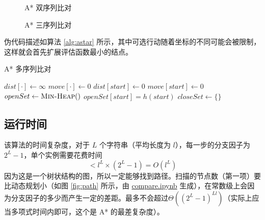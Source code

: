     \begin{figure}[h]
        \centering
        \begin{minipage}{0.48\textwidth}
            \centering
            
            \caption{A* 双序列比对}\label{fig:pairwiseastar}
        \end{minipage}
        \begin{minipage}{0.48\textwidth}
            \centering
            
            \caption{A* 三序列比对}\label{fig:multipleastar}
        \end{minipage}
    \end{figure}

    伪代码描述如算法 \ref{alg:astar} 所示\cite{astarwiki}，其中可选行动随着坐标的不同可能会被限制，这样就会首先扩展评估函数最小的结点。

    \begin{algorithm}[h]
        \caption{A* 多序列比对}\label{alg:astar}
        \BlankLine
        $dist[\cdot]\leftarrow\infty$\;
        $move[\cdot]\leftarrow 0$\;
        $dist[start]\leftarrow 0$\;
        $move[start]\leftarrow 0$\;
        $openSet\leftarrow\textsc{Min-Heap}()$\;
        $openSet[start]=h(start)$\;
        $closeSet\leftarrow \{\}$\;
        \Return{$\infty$}\;
    \end{algorithm}


    \subsection{运行时间}

    该算法的时间复杂度，对于 $L$ 个字符串（平均长度为 $l$），每一步的分支因子为 $2^{L}-1$，单个实例需要花费时间
    \begin{equation*}
     < l^L \times (2^L-1) = O(l^L)
    \end{equation*}
    因为这是一个树状结构的图，所以一定能够找到路径。扫描的节点数（第一项）要比动态规划小（如图 \ref{fig:path} 所示，由 \href{./compare.ipynb}{\ttfamily compare.ipynb} 生成），在常数级上会因为分支因子的多少而产生一定的差距。最多不会超过$\Theta((2^L-1)^{Ll})$（实际上应当多项式时间内即可，这个是 A* 的最差复杂度）。


